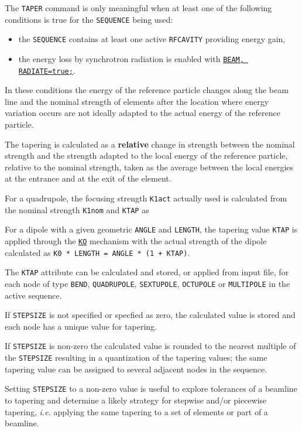 The \texttt{TAPER} command is only meaningful when at least one of the
following conditions is true for the \texttt{SEQUENCE} being used:
\begin{itemize}
  \item the \texttt{SEQUENCE} contains at least one active
    \texttt{RFCAVITY} providing energy gain, 
  \item the energy loss by synchrotron radiation is enabled with
    \hyperref[sec:beam]{\texttt{BEAM, RADIATE=true;}}. 
\end{itemize}
In these conditions the energy of the reference particle changes along
the beam line and the nominal strength of elements after the location
where energy variation occurs are not ideally adapted to the actual
energy of the reference particle. 

The tapering is calculated as a \textbf{relative} change in strength
between the nominal strength and the strength adapted to the local
energy of the reference particle, relative to the nominal strength,
taken as the average between the local energies at the entrance and at
the exit of the element. 

For a quadrupole, the focusing strength \texttt{K1act}
actually used is calculated from the nominal strength \texttt{K1nom} and 
\texttt{KTAP} as 

For a dipole with a given geometric \texttt{ANGLE} and \texttt{LENGTH},
the tapering value \texttt{KTAP} is applied through the
\hyperref[sec:bend]{\texttt{KO}} mechanism with the actual strength of
the dipole calculated as \texttt{K0 * LENGTH = ANGLE * (1 + KTAP)}.

The \texttt{KTAP} attribute can be calculated and stored, or applied
from input file, for each node of type \texttt{BEND},
\texttt{QUADRUPOLE}, \texttt{SEXTUPOLE}, \texttt{OCTUPOLE} or
\texttt{MULTIPOLE} in the active sequence.  

If \texttt{STEPSIZE} is not specified or specfied as zero, the
calculated value is stored and each node has a unique value 
for tapering.

If \texttt{STEPSIZE} is non-zero the calculated value is rounded to the
nearest multiple of the \texttt{STEPSIZE} resulting in a quantization of
the tapering values; the same tapering value can be assigned to several
adjacent nodes in the sequence.

Setting \texttt{STEPSIZE} to a non-zero value is useful to explore tolerances of a
beamline to tapering and determine a likely strategy for stepwise and/or piecewise
tapering, {\it i.e.} applying the same tapering to a set of elements or
part of a beamline.

